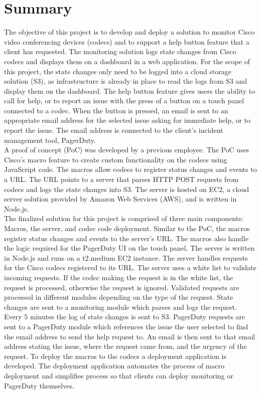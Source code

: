 \documentclass[letterpaper,12pt]{article}
\begin{document}
\section{Summary}
The objective of this project is to develop and deploy a solution to monitor Cisco video conferencing devices (codecs) and to support a help button feature that a client has requested. The monitoring solution logs state changes from Cisco codecs and displays them on a dashboard in a web application. For the scope of this project, the state changes only need to be logged into a cloud storage solution (S3), as infrastructure is already in place to read the logs from S3 and display them on the dashboard. The help button feature gives users the ability to call for help, or to report an issue with the press of a button on a touch panel connected to a codec. When the button is pressed, an email is sent to an appropriate email address for the selected issue asking for immediate help, or to report the issue. The email address is connected to the client's incident management tool, PagerDuty.\\

A proof of concept (PoC) was developed by a previous employee. The PoC uses Cisco's macro feature to create custom functionality on the codecs using JavaScript code. The macros allow codecs to register status changes and events to a URL. The URL points to a server that parses HTTP POST requests from codecs and logs the state changes into S3. The server is hosted on EC2, a cloud server solution provided by Amazon Web Services (AWS), and is written in Node.js.\\

The finalized solution for this project is comprised of three main components: Macros, the server, and codec code deployment. Similar to the PoC, the macros register status changes and events to the server's URL. The macros also handle the logic required for the PagerDuty UI on the touch panel. The server is written in Node.js and runs on a t2.medium EC2 instance. The server handles requests for the Cisco codecs registered to its URL. The server uses a white list to validate incoming requests. If the codec making the request is in the white list, the request is processed, otherwise the request is ignored. Validated requests are processed in different modules depending on the type of the request. State changes are sent to a monitoring module which parses and logs the request. Every 5 minutes the log of state changes is sent to S3. PagerDuty requests are sent to a PagerDuty module which references the issue the user selected to find the email address to send the help request to. An email is then sent to that email address stating the issue, where the request came from, and the urgency of the request. To deploy the macros to the codecs a deployment application is developed. The deployment application automates the process of macro deployment and simplifies process so that clients can deploy monitoring or PagerDuty themselves.
\end{document}
